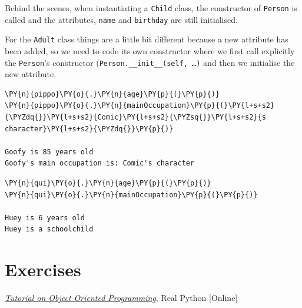 Behind the scenes, when instantiating a \texttt{Child} class, the constructor of 
\texttt{Person} is called and the attributes, \texttt{name} and \texttt{birthday} are still 
initialised.  

For the \texttt{Adult} class things are a little bit different because a new attribute has been 
added, so we need to code its own constructor where we first call explicitly the 
\texttt{Person}'s constructor (\texttt{Person.\_\_init\_\_(self, \ldots)} and then we 
initialise the new attribute.

\begin{codebox}
\begin{Verbatim}[commandchars=\\\{\}]
\PY{n}{pippo}\PY{o}{.}\PY{n}{age}\PY{p}{(}\PY{p}{)}
\PY{n}{pippo}\PY{o}{.}\PY{n}{mainOccupation}\PY{p}{(}\PY{l+s+s2}{\PYZdq{}}\PY{l+s+s2}{Comic}\PY{l+s+s2}{\PYZsq{}}\PY{l+s+s2}{s character}\PY{l+s+s2}{\PYZdq{}}\PY{p}{)}

Goofy is 85 years old
Goofy's main occupation is: Comic's character
\end{Verbatim}
\end{codebox}

\begin{codebox}
\begin{Verbatim}[commandchars=\\\{\}]
\PY{n}{qui}\PY{o}{.}\PY{n}{age}\PY{p}{(}\PY{p}{)}
\PY{n}{qui}\PY{o}{.}\PY{n}{mainOccupation}\PY{p}{(}\PY{p}{)}

Huey is 6 years old
Huey is a schoolchild
\end{Verbatim}
\end{codebox}

\section{Exercises}


\begin{thebibliography}{9}
 \href{https://realpython.com/python3-object-oriented-programming/}{\emph{Tutorial on Object Oriented Programming}}, Real Python [Online]
\end{thebibliography}
